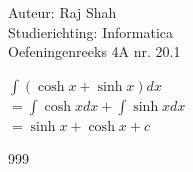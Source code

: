 \documentclass[a4paper]{article}
\begin{document}
  
\noindent \large Auteur: Raj Shah \\
\noindent \large Studierichting: Informatica\\
\noindent \large Oefeningenreeks 4A nr. 20.1 \\

\medskip

\normalsize

$\displaystyle\int (\cosh x + \sinh x) dx$\\

$ = \displaystyle\int \cosh x dx + \displaystyle\int \sinh x dx$\\

$ = \sinh x + \cosh x + c$
\begin{thebibliography}{999}
\end{thebibliography}
\end{document}
